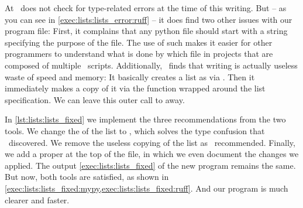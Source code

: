 At \ruff\ does not check for type-related errors at the time of this writing.
But -- as you can see in \cref{exec:lists:lists_error:ruff} -- it does find two other issues with our program file:
First, it complains that any python file should start with a string specifying the purpose of the file.
The use of such  makes it easier for other programmers to understand what is done by which file in projects that are composed of multiple \python\ scripts.%
%
%
%
Additionally, \ruff\ finds that writing  is actually useless waste of speed and memory:
It basically creates a list as  via \pythonil{[1, 2, 3]}.
Then it immediately makes a copy of it via the  function wrapped around the list specification.
We can leave this outer call to  away.

%
%
%
%
In \cref{lst:lists:lists_fixed} we implement the three recommendations from the two tools.
We change the  of the list to , which solves the type confusion that \mypy\ discovered.
We remove the useless copying of the list as \ruff\ recommended.
Finally, we add a proper  at the top of the file, in which we even document the changes we applied.
The output \cref{exec:lists:lists_fixed} of the new program remains the same.
But now, both tools are satisfied, as shown in \cref{exec:lists:lists_fixed:mypy,exec:lists:lists_fixed:ruff}.
And our program is much clearer and faster.

%
%
%
%

